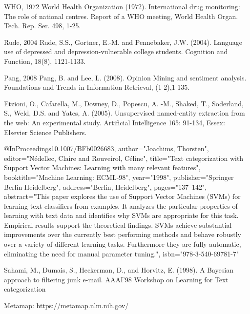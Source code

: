 \documentclass[twoside,11pt]{article}
\begin{document}
WHO, 1972
World Health Organization (1972). International drug monitoring: The role of national centres. Report of a WHO meeting, World Health  Organ. Tech. Rep. Ser. 498, 1-25.

Rude, 2004
Rude, S.S., Gortner, E.-M. and Pennebaker, J.W. (2004). Language use of depressed and depression-vulnerable college students. Cognition and Function, 18(8), 1121-1133.

Pang, 2008
Pang, B. and Lee, L. (2008). Opinion Mining and sentiment analysis.  Foundations and Trends in Information Retrieval, (1-2),1-135.

Etzioni, O., Cafarella, M., Downey, D., Popescu, A. -M., Shaked, T., Soderland, S., Weld, D.S. and Yates, A. (2005). Unsupervised named-entity extraction from the web: An experimental study.  Artificial Intelligence 165: 91-134, Essex: Elsevier Science Publishers.

@InProceedings{10.1007/BFb0026683,
author="Joachims, Thorsten",
editor="N{\'e}dellec, Claire
and Rouveirol, C{\'e}line",
title="Text categorization with Support Vector Machines: Learning with many relevant features",
booktitle="Machine Learning: ECML-98",
year="1998",
publisher="Springer Berlin Heidelberg",
address="Berlin, Heidelberg",
pages="137--142",
abstract="This paper explores the use of Support Vector Machines (SVMs) for learning text classifiers from examples. It analyzes the particular properties of learning with text data and identifies why SVMs are appropriate for this task. Empirical results support the theoretical findings. SVMs achieve substantial improvements over the currently best performing methods and behave robustly over a variety of different learning tasks. Furthermore they are fully automatic, eliminating the need for manual parameter tuning.",
isbn="978-3-540-69781-7"
}


Sahami, M., Dumais, S., Heckerman, D., and Horvitz, E. (1998). A Bayesian approach to filtering junk e-mail.   AAAI'98 Workshop on Learning for Text categorization





Metamap:
https://metamap.nlm.nih.gov/

\vskip 0.2in

\end{document}
